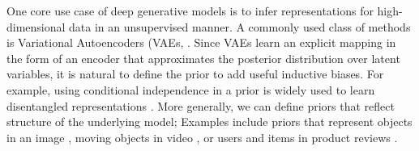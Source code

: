 \documentclass[tablecaption=bottom,wcp]{jmlr} %
\begin{document}
One core use case of deep generative models is to infer representations for high-dimensional data in an unsupervised manner. 
A commonly used class of methods is Variational Autoencoders (VAEs, \cite{kingma2013auto-encoding,rezende2014stochastic}. Since VAEs learn an explicit mapping in the form of an encoder that approximates the posterior distribution over latent variables, it is natural to define the prior to add useful inductive biases. 
For example, using conditional independence in a prior is widely used to learn disentangled representations \cite{higgins2016beta,esmaeili2019structured,kim2018disentangling}. 
More generally, we can define priors that reflect structure of the underlying model; Examples include priors that represent objects in an image \cite{eslami2016air,lin2020space,engelcke2019genesis,crawford2019spatially}, moving objects in video \cite{crawford2019exploiting, kosiorek2018sequential,wu2020amortized,lin2020improving}, or users and items in product reviews \cite{esmaeili2019structuredb}.
\end{document}
